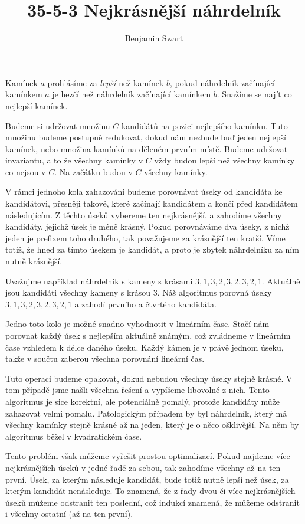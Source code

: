 \documentclass{article}
\title{35-5-3 Nejkrásnější náhrdelník}
\author{Benjamin Swart}
\begin{document}
\maketitle

Kamínek $a$ prohlásíme za \textit{lepší} než kamínek $b$, pokud náhrdelník začínající kamínkem $a$ je hezčí než náhrdelník začínající kamínkem $b$. Snažíme se najít co nejlepší kamínek.

Budeme si udržovat množinu $C$ kandidátů na pozici nejlepšího kamínku. Tuto množinu budeme postupně redukovat, dokud nám nezbude buď jeden nejlepší kamínek, nebo množina kamínků na děleném prvním místě. Budeme udržovat invariantu, a to že všechny kamínky v $C$ vždy budou lepší než všechny kamínky co nejsou v $C$. Na začátku budou v $C$ všechny kamínky.

V rámci jednoho kola zahazování budeme porovnávat úseky od kandidáta ke kandidátovi, přesněji takové, které začínají kandidátem a končí před kandidátem následujícím. Z těchto úseků vybereme ten nejkrásnější, a zahodíme všechny kandidáty, jejichž úsek je méně krásný. Pokud porovnáváme dva úseky, z nichž jeden je prefixem toho druhého, tak považujeme za krásnější ten kratší. Víme totiž, že hned za tímto úsekem je kandidát, a proto je zbytek náhrdelníku za ním nutně krásnější.

Uvažujme například náhrdelník s kameny s krásami $3,1,3,2,3,2,3,2,1$. Aktuálně jsou kandidáti všechny kameny s krásou $3$. Náš algoritmus porovná úseky $\overline{3,1},\overline{3,2},\overline{3,2},\overline{3,2,1}$ a zahodí prvního a čtvrtého kandidáta.

Jedno toto kolo je možné snadno vyhodnotit v lineárním čase. Stačí nám porovnat každý úsek s nejlepším aktuálně známým, což zvládneme v lineárním čase vzhledem k délce daného úseku. Každý kámen je v právě jednom úseku, takže v součtu zaberou všechna porovnání lineární čas.

Tuto operaci budeme opakovat, dokud nebudou všechny úseky stejně krásné. V tom případě jsme našli všechna řešení a vypíšeme libovolné z nich. Tento algoritmus je sice korektní, ale potenciálně pomalý, protože kandidáty může zahazovat velmi pomalu. Patologickým případem by byl náhrdelník, který má všechny kamínky stejně krásné až na jeden, který je o něco ošklivější. Na něm by algoritmus běžel v kvadratickém čase.

Tento problém však můžeme vyřešit prostou optimalizací. Pokud najdeme více nejkrásnějších úseků v jedné řadě za sebou, tak zahodíme všechny až na ten první. Úsek, za kterým následuje kandidát, bude totiž nutně lepší než úsek, za kterým kandidát nenásleduje. To znamená, že z řady dvou či více nejkrásnějších úseků můžeme odstranit ten poslední, což indukcí znamená, že můžeme odstranit i všechny ostatní (až na ten první).
\end{document}
